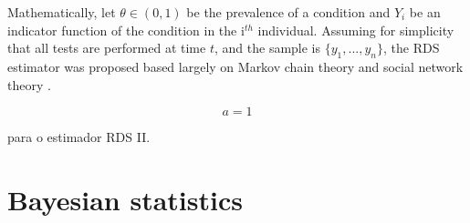 Mathematically, let $\theta \in (0,1)$ be the prevalence of a condition and
$Y_i$ be an  indicator function of the condition in the i$^{th}$ individual.
Assuming for simplicity that all tests are performed at time $t$, and the
sample is $\{y_1, ..., y_n\}$, the RDS estimator was
proposed based largely on Markov chain theory and social network theory
\cite{heckathorn1997, heckathorn2002}. 

\begin{equation}
    \label{eq:rdsI}
     a = 1
\end{equation}

 \cite{volz2008probability} para o estimador RDS II. 

\section{Bayesian statistics}

